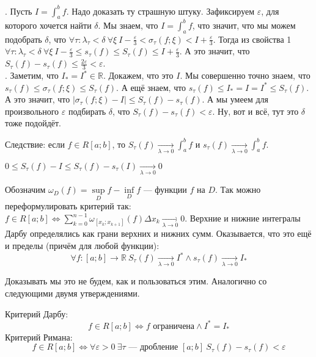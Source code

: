 \documentclass{article}
\begin{document}
\begin{itemize}
\begin{Proof}
            \rightimp. Пусть $I=\int_a^bf$. Надо доказать ту страшную штуку. Зафиксируем $\varepsilon$, для которого хочется найти $\delta$. Мы знаем, что $I=\int_a^bf$, что значит, что мы можем подобрать $\delta$, что $\forall\tau:\lambda_\tau<\delta~\forall\xi~I-\frac\varepsilon3<\sigma_\tau(f;\xi)<I+\frac\varepsilon3$. Тогда из свойства 1 $\forall\tau:\lambda_\tau<\delta~\forall\xi~I-\frac\varepsilon3\leqslant s_\tau(f)\leqslant S_\tau(f)\leqslant I+\frac\varepsilon3$. А это значит, что $S_\tau(f)-s_\tau(f)\leqslant\frac{2\varepsilon}3<\varepsilon$.\\
            \leftimp. Заметим, что $I_*=I^*\in\mathbb R$. Докажем, что это $I$. Мы совершенно точно знаем, что $s_\tau(f)\leqslant\sigma_\tau(f;\xi)\leqslant S_\tau(f)$. А ещё знаем, что $s_\tau(f)\leqslant I_*=I=I^*\leqslant S_\tau(f)$. А это значит, что $|\sigma_\tau(f;\xi)-I|\leqslant S_\tau(f)-s_\tau(f)$. А мы умеем для произвольного $\varepsilon$ подбирать $\delta$, что $S_\tau(f)-s_\tau(f)<\varepsilon$. Ну, вот и всё, тут это $\delta$ тоже подойдёт.
        \end{Proof}
        \thm Следствие: если $f\in R[a;b]$, то $S_\tau(f)\underset{\lambda\to0}\longrightarrow\int_a^bf$ и $s_\tau(f)\underset{\lambda\to0}\longrightarrow\int_a^bf$.
        \begin{Proof}
            $0\leqslant S_\tau(f)-I\leqslant S_\tau(f)-s_\tau(I)\underset{\lambda\to0}\longrightarrow0$
        \end{Proof}
        \dfn Обозначим $\omega_D(f)=\sup\limits_Df-\inf\limits_Df$ ---  функции $f$ на $D$.
        \thm Так можно переформулировать критерий так: $f\in R[a;b]\Leftrightarrow\sum\limits_{k=0}^{n-1}\omega_{[x_k;x_{k+1}]}(f)\Delta x_k\underset{\lambda\to0}\longrightarrow0$.
        \thm Верхние и нижние интегралы Дарбу определялись как грани верхних и нижних сумм. Оказывается, что это ещё и пределы (причём для любой функции):
        $$\forall f\colon[a;b]\to\mathbb R~S_\tau(f)\underset{\lambda\to0}\longrightarrow I^*\land s_\tau(f)\underset{\lambda\to0}\longrightarrow I_*$$
        \begin{Comment}
            Доказывать мы это не будем, как и пользоваться этим. Аналогично со следующими двумя утверждениями.
        \end{Comment}
        \thm Критерий Дарбу:
        $$f\in R[a;b]\Leftrightarrow f\text{ ограничена}\land I^*=I_*$$
        \thm Критерий Римана:
        $$f\in R[a;b]\Leftrightarrow\forall\varepsilon>0~\exists\tau\text{ --- дробление }[a;b]~S_\tau(f)-s_\tau(f)<\varepsilon$$

\end{itemize}
\end{document}
